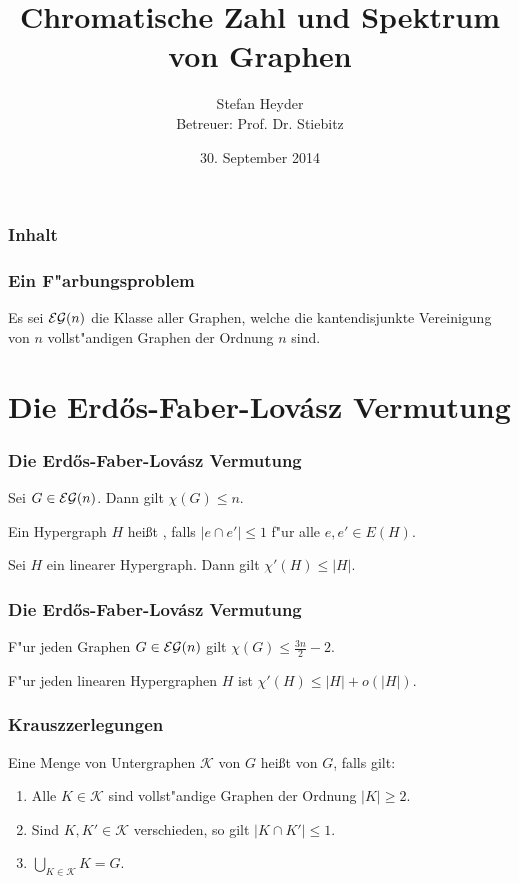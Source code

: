 \documentclass{beamer}
\title[Chrom. Zahl und Spektrum von Graphen]{Chromatische Zahl und Spektrum von Graphen}
\author[Stefan Heyder]{Stefan Heyder \\ Betreuer: Prof. Dr. Stiebitz}
\institute{TU Ilmenau}
\date{30. September 2014}
\begin{document}
\begin{frame}[<+->]
  \titlepage
\end{frame}

\begin{frame}[<+->]
  \frametitle{Inhalt} 
  \tableofcontents 
\end{frame}

\begin{frame}[<+->]
  \frametitle{Ein F"arbungsproblem}
  Es sei ${\cal EG}(n)$ die Klasse aller Graphen, welche die kantendisjunkte Vereinigung von $n$ vollst"andigen Graphen der Ordnung $n$ sind.
\end{frame}

\section{Die Erd\H os-Faber-Lov\'asz Vermutung}

\begin{frame}[<+->]
  \frametitle{Die Erd\H{o}s-Faber-Lov\'asz Vermutung}
  \begin{conjecture}
    Sei $G\in{\cal EG}(n)$. Dann gilt $\chi(G) \leq n$.
  \end{conjecture}
  \pause
  Ein Hypergraph $H$ hei{\ss}t , falls $|e\cap e'| \leq 1$ f"ur alle $e,e'\in E(H)$.
  \pause
  \begin{conjecture}
    Sei $H$ ein linearer Hypergraph. Dann gilt $\chi'(H) \leq |H|$.
  \end{conjecture}
\end{frame}

\begin{frame}[<+->]
  \frametitle{Die Erd\H{o}s-Faber-Lov\'asz Vermutung}
  \begin{theorem}
    F"ur jeden Graphen $G\in {\cal EG}(n)$ gilt $\chi(G) \leq \frac{3n}{2} -2$.
  \end{theorem}
  \begin{theorem}[Kahn]
    F"ur jeden linearen Hypergraphen $H$ ist $\chi'(H) \leq |H| + o(|H|)$.
  \end{theorem}
\end{frame}

\begin{frame}[<+->]
  \frametitle{Krauszzerlegungen}
    Eine Menge von Untergraphen $\mathcal{K}$ von $G$ hei{\ss}t  von $G$, falls gilt:
    \pause
    \begin{enumerate}[<+->]
      \item Alle $K\in \mathcal{K}$ sind vollst"andige Graphen der Ordnung $|K| \geq 2$.
      \item Sind $K,K'\in \mathcal{K}$ verschieden, so gilt $|K\cap K'| \leq 1$.
      \item $\bigcup\limits_{K\in \mathcal{K}} K = G$.
    \end{enumerate}
\end{frame}
\end{document}
